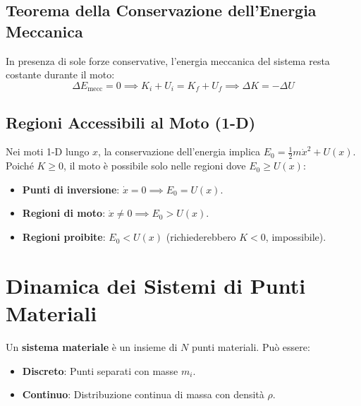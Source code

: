 \subsection{Teorema della Conservazione dell'Energia Meccanica}
In presenza di sole forze conservative, l'energia meccanica del sistema resta costante durante il moto:
\begin{equation}
    \Delta E_{\text{mecc}} = 0 \implies K_i + U_i = K_f + U_f \implies \Delta K = -\Delta U
\end{equation}

\subsection{Regioni Accessibili al Moto (1-D)}
Nei moti 1-D lungo $x$, la conservazione dell'energia implica $E_0 = \frac{1}{2}m\dot{x}^2 + U(x)$. Poiché $K \ge 0$, il moto è possibile solo nelle regioni dove $E_0 \ge U(x)$:
\begin{itemize}
    \item \textbf{Punti di inversione}: $\dot{x} = 0 \implies E_0 = U(x)$.
    \item \textbf{Regioni di moto}: $\dot{x} \neq 0 \implies E_0 > U(x)$.
    \item \textbf{Regioni proibite}: $E_0 < U(x)$ (richiederebbero $K < 0$, impossibile).
\end{itemize}

\begin{center}
\end{center}

\section{Dinamica dei Sistemi di Punti Materiali}
Un \textbf{sistema materiale} è un insieme di $N$ punti materiali. Può essere:
\begin{itemize}
    \item \textbf{Discreto}: Punti separati con masse $m_i$.
    \item \textbf{Continuo}: Distribuzione continua di massa con densità $\rho$.
\end{itemize}

